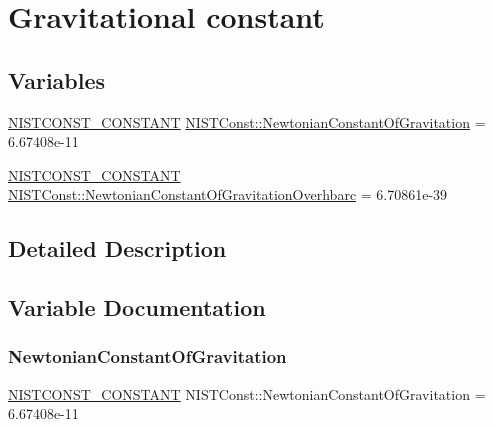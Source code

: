 \hypertarget{group___n_i_s_t_const-_gravitational_constant}{}\section{Gravitational constant}
\label{group___n_i_s_t_const-_gravitational_constant}
\subsection*{Variables}
\begin{DoxyCompactItemize}
\item 
\mbox{\hyperlink{_n_i_s_t_const_8hpp_a2b0fc1d7452373f816175dd86ce26729}{N\+I\+S\+T\+C\+O\+N\+S\+T\+\_\+\+C\+O\+N\+S\+T\+A\+NT}} \mbox{\hyperlink{group___n_i_s_t_const-_gravitational_constant_gacfed5fae03e441055c1f09406a47f8ce}{N\+I\+S\+T\+Const\+::\+Newtonian\+Constant\+Of\+Gravitation}} = 6.\+67408e-\/11
\item 
\mbox{\hyperlink{_n_i_s_t_const_8hpp_a2b0fc1d7452373f816175dd86ce26729}{N\+I\+S\+T\+C\+O\+N\+S\+T\+\_\+\+C\+O\+N\+S\+T\+A\+NT}} \mbox{\hyperlink{group___n_i_s_t_const-_gravitational_constant_gaab8e9e8695add729258bef9e2fc7e9bf}{N\+I\+S\+T\+Const\+::\+Newtonian\+Constant\+Of\+Gravitation\+Overhbarc}} = 6.\+70861e-\/39
\end{DoxyCompactItemize}


\subsection{Detailed Description}


\subsection{Variable Documentation}
\mbox{\label{group___n_i_s_t_const-_gravitational_constant_gacfed5fae03e441055c1f09406a47f8ce}} 
\subsubsection{\texorpdfstring{Newtonian\+Constant\+Of\+Gravitation}{NewtonianConstantOfGravitation}}
{\footnotesize\ttfamily \mbox{\hyperlink{_n_i_s_t_const_8hpp_a2b0fc1d7452373f816175dd86ce26729}{N\+I\+S\+T\+C\+O\+N\+S\+T\+\_\+\+C\+O\+N\+S\+T\+A\+NT}} N\+I\+S\+T\+Const\+::\+Newtonian\+Constant\+Of\+Gravitation = 6.\+67408e-\/11}

